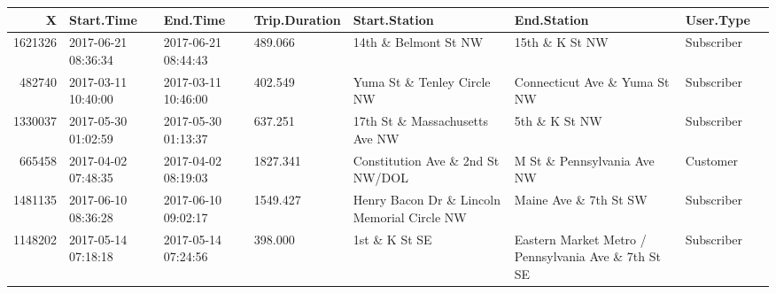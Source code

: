 \documentclass[11pt]{article}
\begin{document}
    \begin{tabular}{r|lllllll}
 X & Start.Time & End.Time & Trip.Duration & Start.Station & End.Station & User.Type\\
\hline
	 1621326                                               & 2017-06-21 08:36:34                                   & 2017-06-21 08:44:43                                   &  489.066                                              & 14th \& Belmont St NW                                & 15th \& K St NW                                      & Subscriber                                           \\
	  482740                                               & 2017-03-11 10:40:00                                   & 2017-03-11 10:46:00                                   &  402.549                                              & Yuma St \& Tenley Circle NW                          & Connecticut Ave \& Yuma St NW                        & Subscriber                                           \\
	 1330037                                               & 2017-05-30 01:02:59                                   & 2017-05-30 01:13:37                                   &  637.251                                              & 17th St \& Massachusetts Ave NW                      & 5th \& K St NW                                       & Subscriber                                           \\
	  665458                                               & 2017-04-02 07:48:35                                   & 2017-04-02 08:19:03                                   & 1827.341                                              & Constitution Ave \& 2nd St NW/DOL                    & M St \& Pennsylvania Ave NW                          & Customer                                             \\
	 1481135                                               & 2017-06-10 08:36:28                                   & 2017-06-10 09:02:17                                   & 1549.427                                              & Henry Bacon Dr \& Lincoln Memorial Circle NW         & Maine Ave \& 7th St SW                               & Subscriber                                           \\
	 1148202                                               & 2017-05-14 07:18:18                                   & 2017-05-14 07:24:56                                   &  398.000                                              & 1st \& K St SE                                       & Eastern Market Metro / Pennsylvania Ave \& 7th St SE & Subscriber                                           \\
\end{tabular}
\end{document}
